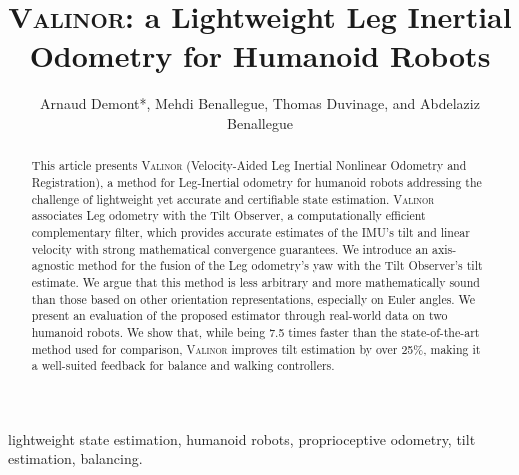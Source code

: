 \documentclass{IJCAS}
\begin{document}
\newcommand{\getErrorResult}[5]{\csname#1#2#3#4#5\endcsname}



\title{{\scshape Valinor}: a Lightweight Leg Inertial Odometry for Humanoid Robots}

\author{Arnaud Demont*, Mehdi Benallegue, Thomas Duvinage, and Abdelaziz Benallegue}

\begin{abstract}
This article presents {\scshape Valinor} (Velocity-Aided Leg Inertial Nonlinear Odometry and Registration), a method for Leg-Inertial odometry for humanoid robots addressing the challenge of lightweight yet accurate and certifiable state estimation. {\scshape Valinor} associates Leg odometry with the Tilt Observer, a computationally efficient complementary filter, which provides accurate estimates of the IMU's tilt and linear velocity with strong mathematical convergence guarantees. We introduce an axis-agnostic method for the fusion of the Leg odometry's yaw with the Tilt Observer's tilt estimate. We argue that this method is less arbitrary and more mathematically sound than those based on other orientation representations, especially on Euler angles.
We present an evaluation of the proposed estimator through real-world data on two humanoid robots. We show that, while being 7.5 times faster than the state-of-the-art method used for comparison, {\scshape Valinor} improves tilt estimation by over 25\%, making it a well-suited feedback for balance and walking controllers. 
\end{abstract}

\begin{keywords}
  lightweight state estimation, humanoid robots, proprioceptive odometry, tilt estimation, balancing.
\end{keywords}

\maketitle

\end{document}
